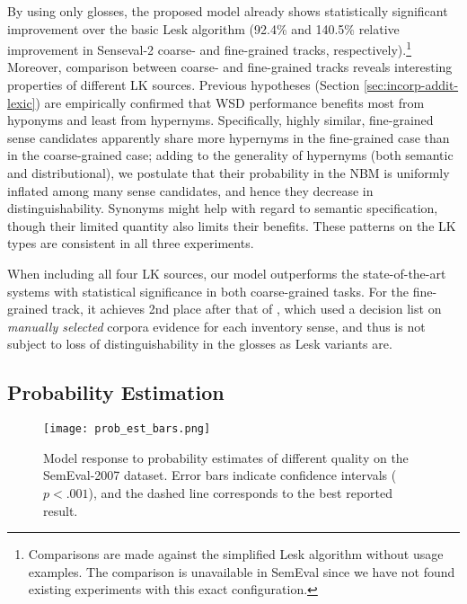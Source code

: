 \documentclass[11pt]{article}
\begin{document}
By using only glosses, the proposed model already shows statistically
significant improvement over the basic Lesk algorithm (92.4\% and
140.5\% relative improvement in Senseval-2 coarse- and fine-grained
tracks, respectively).\footnote{Comparisons are made against the
  simplified Lesk algorithm \citep{kilgarriff2000framework} without
  usage examples. The comparison is unavailable in SemEval since
  we have not found existing experiments with this exact
  configuration.} Moreover, comparison between coarse- and
fine-grained tracks reveals interesting properties of different LK
sources. Previous hypotheses (Section \ref{sec:incorp-addit-lexic})
are empirically confirmed that WSD performance benefits most from
hyponyms and least from hypernyms. Specifically, highly similar,
fine-grained sense candidates apparently share more hypernyms in the
fine-grained case than in the coarse-grained case; adding to the
generality of hypernyms (both semantic and distributional), we
postulate that their probability in the NBM is uniformly inflated
among many sense candidates, and hence they decrease in
distinguishability. Synonyms might help with regard to semantic
specification, though their limited quantity also limits their
benefits. These patterns on the LK types are consistent in all three
experiments.


When including all four LK sources, our model outperforms the
state-of-the-art systems with statistical significance in both
coarse-grained tasks. For the fine-grained track, it achieves 2nd
place after that of \citet{tugwell2001wasp}, which used a decision
list \citep{yarowsky1995unsupervised} on \textit{manually selected}
corpora evidence for each inventory sense, and thus is not subject to
loss of distinguishability in the glosses as Lesk variants are.


\subsection{Probability Estimation}
\label{sec:coocc-prob-estim}
\begin{figure}[t]
  \centering
  \texttt{[image: prob\_est\_bars.png]}
  \caption{{Model response to probability estimates of different
      quality on the SemEval-2007 dataset. Error bars indicate
      confidence intervals ($p<.001$), and the dashed line corresponds
      to the best reported result.} }
  \label{fig:model_response}
\end{figure}
 
\end{document}
